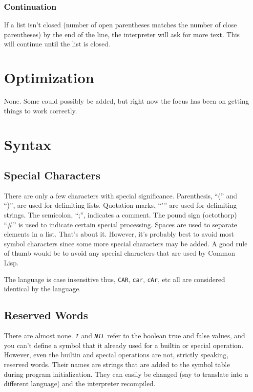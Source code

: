 \documentclass[10pt, openany]{book}
\newcommand{\function}[1]{\texttt{#1}}
\newcommand{\constant}[1]{\emph{\texttt{#1}}}
\newcommand{\cl}{Common Lisp}
\begin{document}
\subsubsection{Continuation}
If a list isn't closed (number of open parentheses matches the number of close parentheses) by the end of the line, the interpreter will ask for more text.  This will continue until the list is closed.

\section{Optimization}
None.  Some could possibly be added, but right now the focus has been on getting things to work correctly.

\section{Syntax}

\subsection{Special Characters}
There are only a few characters with special significance.  Parenthesis, ``('' and ``)'', are used for delimiting lists.  Quotation marks, ``"'' are used for delimiting strings.  The semicolon, ``;'', indicates a comment.  The pound sign (octothorp) ``\#'' is used to indicate certain special processing.  Spaces are used to separate elements in a list.  That's about it.  However, it's probably best to avoid most symbol characters since some more special characters may be added.  A good rule of thumb would be to avoid any special characters that are used by \cl.

The language is case insensitive thus, \function{CAR}, \function{car}, \function{cAr}, etc all are considered identical by the language.

\subsection{Reserved Words}
There are almost none.  \constant{T} and \constant{NIL} refer to the boolean true and false values, and you can't define a symbol that it already used for a builtin or special operation.  However, even the builtin and special operations are not, strictly speaking, reserved words.  Their names are strings that are added to the symbol table during program initialization.  They can easily be changed (say to translate into a different language) and the interpreter recompiled.
\end{document}
